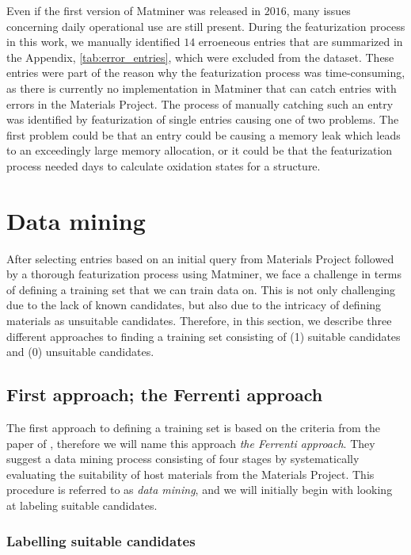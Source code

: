 Even if the first version of Matminer was released in $2016$, many issues concerning daily operational use are still present. During the featurization process in this work, we manually identified $14$ erroeneous entries that are summarized in the Appendix, \autoref{tab:error_entries}, which were excluded from the dataset. These entries were part of the reason why the featurization process was time-consuming, as there is currently no implementation in Matminer that can catch entries with errors in the Materials Project. The process of manually catching such an entry was identified by featurization of single entries causing one of two problems. The first problem could be that an entry could be causing a memory leak which leads to an exceedingly large memory allocation, or it could be that the featurization process needed days to calculate oxidation states for a structure.

\section{Data mining}
\label{sec:data mining}
After selecting entries based on an initial query from Materials Project followed by a thorough featurization process using Matminer, we face a challenge in terms of defining a training set that we can train data on. This is not only challenging due to the lack of known candidates, but also due to the intricacy of defining materials as unsuitable candidates. Therefore, in this section, we describe three different approaches to finding a training set consisting of (1) suitable candidates and (0) unsuitable candidates.

\subsection{First approach; the Ferrenti approach}

The first approach to defining a training set is based on the criteria from the paper  of \citeauthor{Ferrenti2020} \cite{Ferrenti2020}, therefore we will name this approach \textit{the Ferrenti approach}. They suggest a data mining process consisting of four stages by systematically evaluating the suitability of host materials from the Materials Project. This procedure is referred to as \textit{data mining}, and we will initially begin with looking at labeling suitable candidates.

\subsubsection{Labelling suitable candidates}

